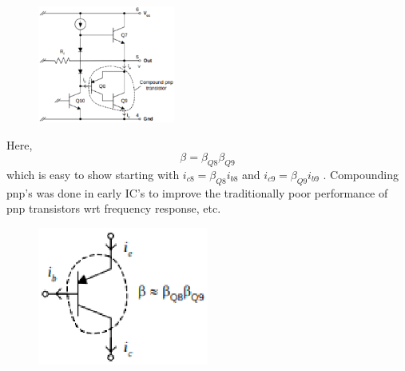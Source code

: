 \documentclass[journal,12pt,twocolumn]{IEEEtran}
\renewcommand\thesection{\arabic{section}}
\begin{document}
\begin{enumerate}[label=\thesection.\arabic*,ref=\thesection.\theenumi]
\begin{figure}[!ht]
    \includegraphics[width=0.4\textwidth]{./Fig/LM3867.eps}

\caption{}
\label{fig:1}
\end{figure}
\solution
Here,
$$\beta = \beta_{Q8} \beta_{Q9}$$  which is easy to show starting with
$i_{c8}=\beta_{Q8}i_{b8}$ and $i_{c9}=\beta_{Q9}i_{b9}$ . Compounding pnp’s was done in
early IC’s to improve the traditionally poor performance of pnp
transistors wrt frequency response, etc. 


\begin{figure}[!ht]
  \centering
 
    \includegraphics[width=0.5\textwidth]{./Fig/LM3868.eps}

\caption{}
\label{fig:1}
\end{figure}
\end{enumerate}
\end{document}
